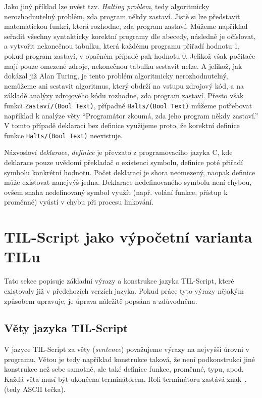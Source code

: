 Jako jiný příklad lze uvést tzv. \textit{Halting problem}, tedy algoritmicky nerozhodnutelný
problém, zda program někdy zastaví. Jistě si lze představit matematickou funkci, která rozhodne,
zda program zastaví. Můžeme například seřadit všechny syntakticky korektní programy dle abecedy,
následně je očíslovat, a vytvořit nekonečnou tabulku, která každému programu přiřadí hodnotu 1,
pokud program zastaví, v opačném případě pak hodnotu 0. Jelikož však počítače mají pouze omezené
zdroje, nekonečnou tabulku sestavit nelze. A jelikož, jak dokázal již Alan Turing, je tento problém
algoritmicky nerozhodnutelný, nemůžeme ani sestavit algoritmus, který obdrží na vstupu zdrojový kód,
a na základě analýzy zdrojového kódu rozhodne, zda program zastaví. Přesto však funkci
\lstinline{Zastaví/(Bool Text)}, případně \lstinline{Halts/(Bool Text)} můžeme potřebovat například
k analýze věty ``Programátor zkoumá, zda jeho program někdy zastaví.'' V tomto případě deklaraci bez
definice využijeme proto, že korektní definice funkce \lstinline{Halts/(Bool Text)} neexistuje.

Názvosloví \textit{deklarace}, \textit{definice} je převzato z programovacího jazyka C, kde
deklarace pouze uvědomí překladač o existenci symbolu, definice poté přiřadí symbolu konkrétní
hodnotu. Počet deklarací je shora neomezený, naopak definice může existovat nanejvýš jedna.
Deklarace nedefinovaného symbolu není chybou, ovšem snaha nedefinovaný symbol využít (např. volání
funkce, přístup k proměnné) vyústí v chybu při procesu linkování.

\section{TIL-Script jako výpočetní varianta TILu}

Tato sekce popisuje základní výrazy a konstrukce jazyka TIL-Script, které existovaly již
v předchozích verzích jazyka. Pokud práce tyto výrazy nějakým způsobem upravuje, je úprava náležitě
popsána a zdůvodněna.

\subsection{Věty jazyka TIL-Script}

V jazyce TIL-Script za věty (\textit{sentence}) považujeme výrazy na nejvyšší úrovni v programu.
Větou je tedy například konstrukce taková, že není podkonstrukcí jiné konstrukce než sebe samotné,
ale také definice funkce, proměnné, typu, apod. Každá věta musí být ukončena terminátorem. Roli
terminátoru zastává znak \lstinline{.} (tedy ASCII tečka).

